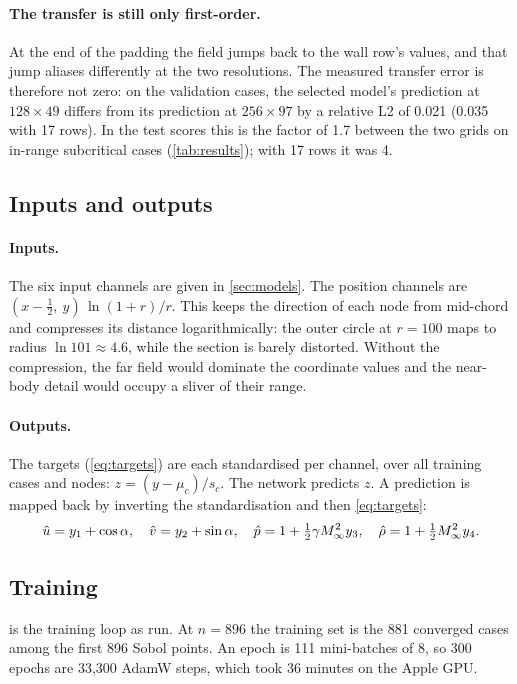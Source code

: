 \paragraph{The transfer is still only first-order.}
At the end of the padding the field jumps back to the wall row's values, and that jump aliases
differently at the two resolutions. The measured transfer error is therefore not zero: on the
validation cases, the selected model's prediction at $128\times49$ differs from its prediction at
$256\times97$ by a relative L2 of 0.021 (0.035 with 17 rows). In the test scores this is the
factor of 1.7 between the two grids on in-range subcritical cases (\cref{tab:results}); with 17
rows it was 4.

\subsection{Inputs and outputs}

\paragraph{Inputs.}
The six input channels are given in \cref{sec:models}. The position channels are
$(x - \tfrac12,\ y)\,\ln(1+r)/r$. This keeps the direction of each node from mid-chord and
compresses its distance logarithmically: the outer circle at $r = 100$ maps to radius
$\ln101\approx4.6$, while the section is barely distorted. Without the compression, the far field
would dominate the coordinate values and the near-body detail would occupy a sliver of their range.

\paragraph{Outputs.}
The targets (\cref{eq:targets}) are each standardised per channel, over all training cases and
nodes: $z = (y - \mu_c)/s_c$. The network predicts $z$. A prediction is mapped back by inverting
the standardisation and then \cref{eq:targets}:
\begin{equation}
  \hat u = y_1 + \cos\alpha,\quad \hat v = y_2 + \sin\alpha,\quad
  \hat p = 1 + \tfrac12\gamma M_\infty^2 y_3,\quad \hat\rho = 1 + \tfrac12M_\infty^2 y_4.
\end{equation}

\subsection{Training}

 is the training loop as run. At $n = 896$ the training set is the 881 converged
cases among the first 896 Sobol points. An epoch is 111 mini-batches of 8, so 300 epochs are
33,300 AdamW steps, which took 36 minutes on the Apple GPU.

